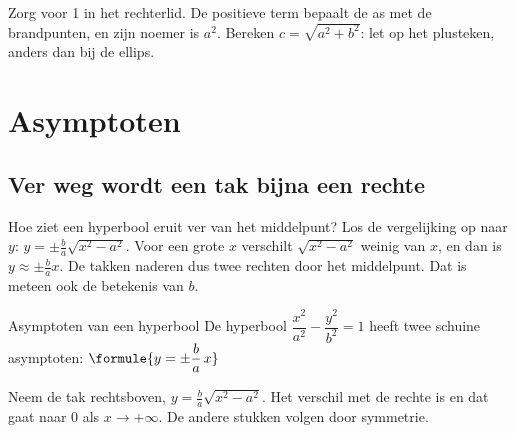 
\begin{werkwijze}
Zorg voor 1 in het rechterlid. De positieve term bepaalt de as met de brandpunten, en zijn noemer is $a^2$. Bereken $c = \sqrt{a^2 + b^2}$: let op het plusteken, anders dan bij de ellips.
\end{werkwijze}


\begin{oefeningen}
\end{oefeningen}

\section{Asymptoten}

\subsection{Ver weg wordt een tak bijna een rechte}

Hoe ziet een hyperbool eruit ver van het middelpunt? Los de vergelijking op naar $y$: $y = \pm\tfrac ba\sqrt{x^2 - a^2}$. Voor een grote $x$ verschilt $\sqrt{x^2 - a^2}$ weinig van $x$, en dan is $y \approx \pm\tfrac ba x$. De takken naderen dus twee rechten door het middelpunt. Dat is meteen ook de betekenis van $b$.

\begin{theorie}
\begin{stelling}{Asymptoten van een hyperbool}
De hyperbool $\dfrac{x^2}{a^2} - \dfrac{y^2}{b^2} = 1$ heeft twee schuine asymptoten: \qquad $\formule{y = \pm\dfrac ba\, x}$
\end{stelling}

\begin{bewijs}
Neem de tak rechtsboven, $y = \tfrac ba\sqrt{x^2 - a^2}$. Het verschil met de rechte is
en dat gaat naar 0 als $x \to +\infty$. De andere stukken volgen door symmetrie.
\end{bewijs}
\end{theorie}

